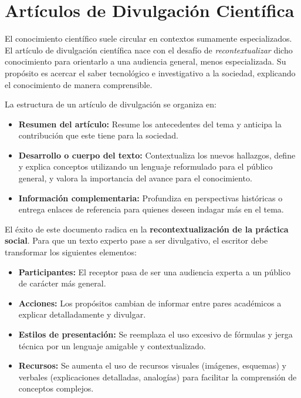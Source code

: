 \documentclass[11pt]{article}
\begin{document}
\newpage
\section{Artículos de Divulgación Científica}

El conocimiento científico suele circular en contextos sumamente especializados. El artículo de divulgación científica nace con el desafío de \textit{recontextualizar} dicho conocimiento para orientarlo a una audiencia general, menos especializada. Su propósito es acercar el saber tecnológico e investigativo a la sociedad, explicando el conocimiento de manera comprensible.

La estructura de un artículo de divulgación se organiza en:
\begin{itemize}
	\item \textbf{Resumen del artículo:} Resume los antecedentes del tema y anticipa la contribución que este tiene para la sociedad.
	\item \textbf{Desarrollo o cuerpo del texto:} Contextualiza los nuevos hallazgos, define y explica conceptos utilizando un lenguaje reformulado para el público general, y valora la importancia del avance para el conocimiento.
	\item \textbf{Información complementaria:} Profundiza en perspectivas históricas o entrega enlaces de referencia para quienes deseen indagar más en el tema.
\end{itemize}

El éxito de este documento radica en la \textbf{recontextualización de la práctica social}. Para que un texto experto pase a ser divulgativo, el escritor debe transformar los siguientes elementos:
\begin{itemize}
	\item \textbf{Participantes:} El receptor pasa de ser una audiencia experta a un público de carácter más general.
	\item \textbf{Acciones:} Los propósitos cambian de informar entre pares académicos a explicar detalladamente y divulgar.
	\item \textbf{Estilos de presentación:} Se reemplaza el uso excesivo de fórmulas y jerga técnica por un lenguaje amigable y contextualizado.
	\item \textbf{Recursos:} Se aumenta el uso de recursos visuales (imágenes, esquemas) y verbales (explicaciones detalladas, analogías) para facilitar la comprensión de conceptos complejos.
\end{itemize}
\end{document}
